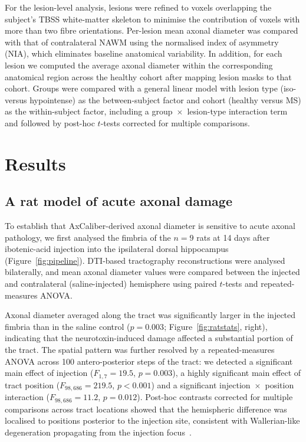 \documentclass[11pt]{article}
\begin{document}
For the lesion-level analysis, lesions were refined to voxels overlapping the subject's TBSS white-matter skeleton to minimise the contribution of voxels with more than two fibre orientations. Per-lesion mean axonal diameter was compared with that of contralateral NAWM using the normalised index of asymmetry (NIA), which eliminates baseline anatomical variability. In addition, for each lesion we computed the average axonal diameter within the corresponding anatomical region across the healthy cohort after mapping lesion masks to that cohort. Groups were compared with a general linear model with lesion type (iso- versus hypointense) as the between-subject factor and cohort (healthy versus MS) as the within-subject factor, including a group~$\times$~lesion-type interaction term and followed by post-hoc $t$-tests corrected for multiple comparisons.

\section{Results}

\subsection{A rat model of acute axonal damage}

To establish that AxCaliber-derived axonal diameter is sensitive to acute axonal pathology, we first analysed the fimbria of the $n=9$ rats at 14 days after ibotenic-acid injection into the ipsilateral dorsal hippocampus (Figure~\ref{fig:pipeline}). DTI-based tractography reconstructions were analysed bilaterally, and mean axonal diameter values were compared between the injected and contralateral (saline-injected) hemisphere using paired $t$-tests and repeated-measures ANOVA.

Axonal diameter averaged along the tract was significantly larger in the injected fimbria than in the saline control ($p=0.003$; Figure~\ref{fig:ratstats}, right), indicating that the neurotoxin-induced damage affected a substantial portion of the tract. The spatial pattern was further resolved by a repeated-measures ANOVA across 100 antero-posterior steps of the tract: we detected a significant main effect of injection ($F_{1,7}=19.5$, $p=0.003$), a highly significant main effect of tract position ($F_{98,686}=219.5$, $p<0.001$) and a significant injection~$\times$~position interaction ($F_{98,686}=11.2$, $p=0.012$). Post-hoc contrasts corrected for multiple comparisons across tract locations showed that the hemispheric difference was localised to positions posterior to the injection site, consistent with Wallerian-like degeneration propagating from the injection focus~\cite{conforti2014wallerian}.
\end{document}
